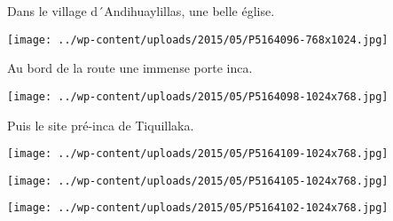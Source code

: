  Dans le village d´Andihuaylillas, une belle église. \newline
 \newline
\centerline{\texttt{[image: ../wp-content/uploads/2015/05/P5164096-768x1024.jpg]} } 
 \newline
 Au bord de la route une immense porte inca. \newline
 \newline
\centerline{\texttt{[image: ../wp-content/uploads/2015/05/P5164098-1024x768.jpg]} } 
 \newline
 Puis le site pré-inca de Tiquillaka. \newline
 \newline
\centerline{\texttt{[image: ../wp-content/uploads/2015/05/P5164109-1024x768.jpg]} } 
 \newline
 \newline
\centerline{\texttt{[image: ../wp-content/uploads/2015/05/P5164105-1024x768.jpg]} } 
 \newline
 \newline
\centerline{\texttt{[image: ../wp-content/uploads/2015/05/P5164102-1024x768.jpg]} } 
 \newline

\newpage
 
